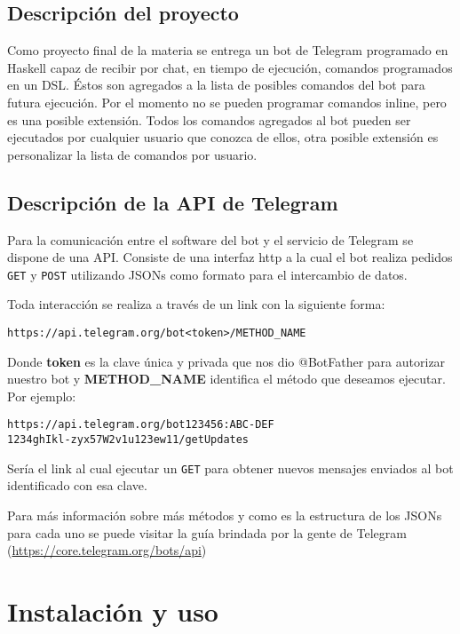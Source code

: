 \documentclass[12pt,a4paper,final]{article}
\begin{document}
\subsection{Descripción del proyecto}
Como proyecto final de la materia se entrega un bot de Telegram programado en Haskell capaz de recibir por chat, en tiempo de ejecución, comandos programados en un DSL. Éstos son agregados a la lista de posibles comandos del bot para futura ejecución. Por el momento no se pueden programar comandos inline, pero es una posible extensión. Todos los comandos agregados al bot pueden ser ejecutados por cualquier usuario que conozca de ellos, otra posible extensión es personalizar la lista de comandos por usuario.

\subsection{Descripción de la API de Telegram}
Para la comunicación entre el software del bot y el servicio de Telegram se dispone de una API. Consiste de una interfaz http a la cual el bot realiza pedidos \texttt{GET} y \texttt{POST} utilizando JSONs como formato para el intercambio de datos.

Toda interacción se realiza a través de un link con la siguiente forma:

\begin{alltt}
https://api.telegram.org/bot{\textless}token{\textgreater}/METHOD{\_}NAME
\end{alltt}

Donde \textbf{token} es la clave única y privada que nos dio @BotFather para autorizar nuestro bot y \textbf{METHOD{\_}NAME} identifica el método que deseamos ejecutar. Por ejemplo:

\begin{alltt}
https://api.telegram.org/bot123456:ABC-DEF\\1234ghIkl-zyx57W2v1u123ew11/getUpdates
\end{alltt}

Sería el link al cual ejecutar un \texttt{GET} para obtener nuevos mensajes enviados al bot identificado con esa clave.

Para más información sobre más métodos y como es la estructura de los JSONs para cada uno se puede visitar la guía brindada por la gente de Telegram (\url{https://core.telegram.org/bots/api})

\section{Instalación y uso}
\end{document}
